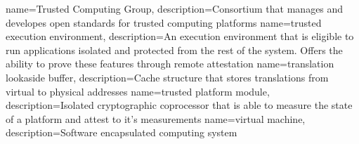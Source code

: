 {
    name=Trusted Computing Group,
    description={Consortium that manages and developes open standards for trusted computing platforms}
}
{
    name=trusted execution environment,
    description={An execution environment that is eligible to run applications isolated and protected from the rest of
            the system. Offers the ability to prove these features through remote attestation}
}
{
    name=translation lookaside buffer,
    description={Cache structure that stores translations from virtual to physical addresses}
}
{
    name=trusted platform module,
    description={Isolated cryptographic coprocessor that is able to measure the state of a platform and attest to it's measurements}
}
%
{
    name=virtual machine,
    description={Software encapsulated computing system}
}
